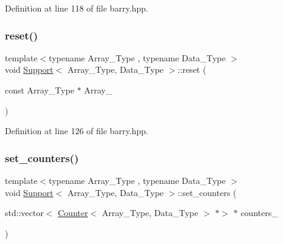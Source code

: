 Definition at line 118 of file barry.\+hpp.

\mbox{\label{classbarry_1_1_support_afbe207cc2762bc698c9ccb3212e9de78}} 
\subsubsection{\texorpdfstring{reset()}{reset()}\hspace{0.1cm}{\footnotesize\ttfamily [2/2]}}
{\footnotesize\ttfamily template$<$typename Array\+\_\+\+Type , typename Data\+\_\+\+Type $>$ \\
void \hyperlink{classbarry_1_1_support}{Support}$<$ Array\+\_\+\+Type, Data\+\_\+\+Type $>$\+::reset (\begin{DoxyParamCaption}\item[{const Array\+\_\+\+Type $\ast$}]{Array\+\_\+ }\end{DoxyParamCaption})\hspace{0.3cm}{\ttfamily [inline]}}



Definition at line 126 of file barry.\+hpp.

\mbox{\label{classbarry_1_1_support_a07f225ee54158980ededaccc47abad4c}} 
\subsubsection{\texorpdfstring{set\+\_\+counters()}{set\_counters()}}
{\footnotesize\ttfamily template$<$typename Array\+\_\+\+Type , typename Data\+\_\+\+Type $>$ \\
void \hyperlink{classbarry_1_1_support}{Support}$<$ Array\+\_\+\+Type, Data\+\_\+\+Type $>$\+::set\+\_\+counters (\begin{DoxyParamCaption}\item[{std\+::vector$<$ \hyperlink{classbarry_1_1_counter}{Counter}$<$ Array\+\_\+\+Type, Data\+\_\+\+Type $>$ $\ast$$>$ $\ast$}]{counters\+\_\+ }\end{DoxyParamCaption})\hspace{0.3cm}{\ttfamily [inline]}}



